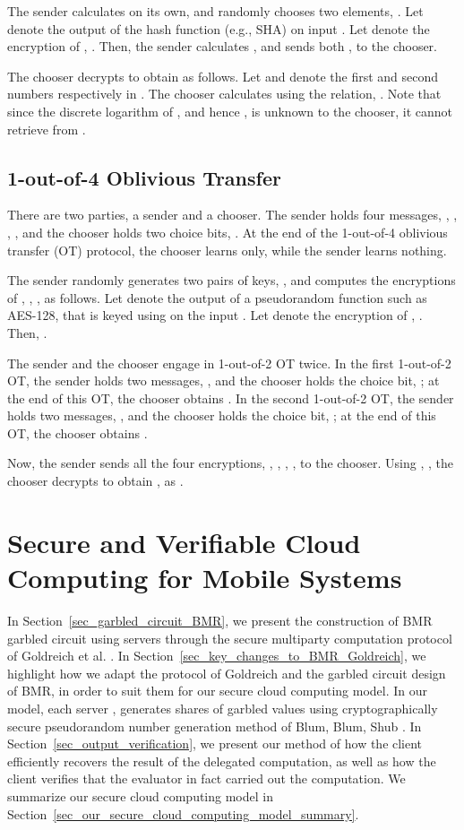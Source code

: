 \documentclass[10pt,journal,cspaper,compsoc]{IEEEtran}
\begin{document}
The sender calculates  on its own, and randomly chooses two elements, . Let  denote the output of the hash function (e.g., SHA) on input . Let  denote the encryption of , . Then, the sender calculates , and sends both ,  to the chooser.


The chooser decrypts  to obtain  as follows. Let  and  denote the first and second numbers respectively in . The chooser calculates  using the relation, . Note that since the discrete logarithm of , and hence , is unknown to the chooser, it cannot retrieve  from .


\subsection{1-out-of-4 Oblivious Transfer}
\label{sec_1_out_of_4_OT}

There are two parties, a sender and a chooser. The sender holds four messages, , , , , and the chooser holds two choice bits, . At the end of the 1-out-of-4 oblivious transfer (OT) protocol, the chooser learns  only, while the sender learns nothing.


The sender randomly generates two pairs of keys, , and computes the encryptions of , , ,  as follows. Let  denote the output of a pseudorandom function such as AES-128, that is keyed using  on the input . Let  denote the encryption of , . Then, .


The sender and the chooser engage in 1-out-of-2 OT twice. In the first 1-out-of-2 OT, the sender holds two messages, , and the chooser holds the choice bit, ; at the end of this OT, the chooser obtains . In the second 1-out-of-2 OT, the sender holds two messages, , and the chooser holds the choice bit, ; at the end of this OT, the chooser obtains .


Now, the sender sends all the four encryptions, , , , , to the chooser. Using , , the chooser decrypts  to obtain , as .

 \section{Secure and Verifiable Cloud Computing for Mobile Systems}
\label{sec_our_cloud_computing_model}

In Section~\ref{sec_garbled_circuit_BMR}, we present the construction of BMR garbled circuit \cite{beaver90,rogaway91} using  servers through the secure multiparty computation protocol of Goldreich et al. \cite{goldreich04,goldreich87}. In Section~\ref{sec_key_changes_to_BMR_Goldreich}, we highlight how we adapt the protocol of Goldreich and the garbled circuit design of BMR, in order to suit them for our secure cloud computing model. In our model, each server , generates shares of garbled values using cryptographically secure pseudorandom number generation method of Blum, Blum, Shub \cite{blum86,schneier95}. In Section~\ref{sec_output_verification}, we present our method of how the client efficiently recovers the result of the delegated computation, as well as how the client verifies that the evaluator in fact carried out the computation. We summarize our secure cloud computing model in Section~\ref{sec_our_secure_cloud_computing_model_summary}.
\end{document}
